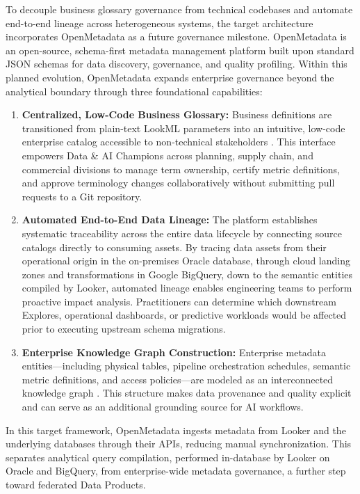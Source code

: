 To decouple business glossary governance from technical codebases and automate end-to-end lineage across heterogeneous systems, the target architecture incorporates OpenMetadata as a future governance milestone. OpenMetadata is an open-source, schema-first metadata management platform built upon standard JSON schemas for data discovery, governance, and quality profiling. Within this planned evolution, OpenMetadata expands enterprise governance beyond the analytical boundary through three foundational capabilities:

\begin{enumerate}
    \item \textbf{Centralized, Low-Code Business Glossary:} Business definitions are transitioned from plain-text LookML parameters into an intuitive, low-code enterprise catalog accessible to non-technical stakeholders \cite{dama2024dmbok}. This interface empowers Data \& AI Champions across planning, supply chain, and commercial divisions to manage term ownership, certify metric definitions, and approve terminology changes collaboratively without submitting pull requests to a Git repository.
    \item \textbf{Automated End-to-End Data Lineage:} The platform establishes systematic traceability across the entire data lifecycle by connecting source catalogs directly to consuming assets. By tracing data assets from their operational origin in the on-premises Oracle database, through cloud landing zones and transformations in Google BigQuery, down to the semantic entities compiled by Looker, automated lineage enables engineering teams to perform proactive impact analysis. Practitioners can determine which downstream Explores, operational dashboards, or predictive workloads would be affected prior to executing upstream schema migrations.
    \item \textbf{Enterprise Knowledge Graph Construction:} Enterprise metadata entities---including physical tables, pipeline orchestration schedules, semantic metric definitions, and access policies---are modeled as an interconnected knowledge graph \cite{hogan2021knowledge}. This structure makes data provenance and quality explicit and can serve as an additional grounding source for AI workflows.
\end{enumerate}

In this target framework, OpenMetadata ingests metadata from Looker and the underlying databases through their APIs, reducing manual synchronization. This separates analytical query compilation, performed in-database by Looker on Oracle and BigQuery, from enterprise-wide metadata governance, a further step toward federated Data Products.


